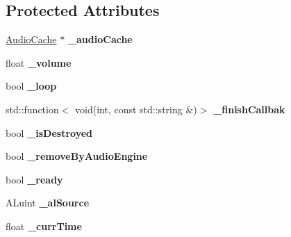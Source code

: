 \subsection*{Protected Attributes}
\begin{DoxyCompactItemize}
\item 
\mbox{\label{classexperimental_1_1AudioPlayer_af99d02a1e16e60d79d4e865a79376ef3}} 
\hyperlink{classexperimental_1_1AudioCache}{Audio\+Cache} $\ast$ {\bfseries \+\_\+audio\+Cache}
\item 
\mbox{\label{classexperimental_1_1AudioPlayer_a8ba2f88c3a3b4472161293c415128c3c}} 
float {\bfseries \+\_\+volume}
\item 
\mbox{\label{classexperimental_1_1AudioPlayer_a4f0a70a0bcd3a1af90245e6051d16a0d}} 
bool {\bfseries \+\_\+loop}
\item 
\mbox{\label{classexperimental_1_1AudioPlayer_a19f95b5d54ac1e248f4f3839a105a5ca}} 
std\+::function$<$ void(int, const std\+::string \&)$>$ {\bfseries \+\_\+finish\+Callbak}
\item 
\mbox{\label{classexperimental_1_1AudioPlayer_ab09d3dd056aec744361f097a3bddc521}} 
bool {\bfseries \+\_\+is\+Destroyed}
\item 
\mbox{\label{classexperimental_1_1AudioPlayer_a2fcd9f0bb6a3d6ca3a409cc50fbe1079}} 
bool {\bfseries \+\_\+remove\+By\+Audio\+Engine}
\item 
\mbox{\label{classexperimental_1_1AudioPlayer_a4c471f47428f439830040bdfefabff12}} 
bool {\bfseries \+\_\+ready}
\item 
\mbox{\label{classexperimental_1_1AudioPlayer_ad77f5474777353fad5ba0743bad17306}} 
A\+Luint {\bfseries \+\_\+al\+Source}
\item 
\mbox{\label{classexperimental_1_1AudioPlayer_ae0c1c3b97e043087f8363ba1c1dfa260}} 
float {\bfseries \+\_\+curr\+Time}
\item 

\end{DoxyCompactItemize}
